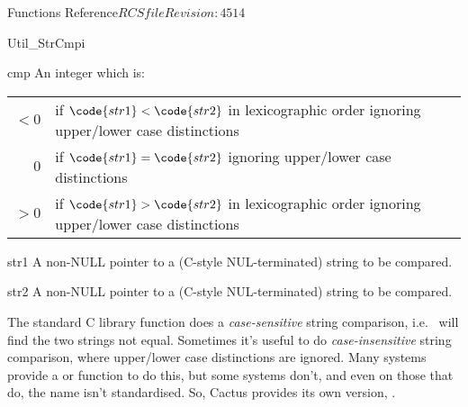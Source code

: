 \begin{cactuspart}{ Functions Reference}{$RCSfile$}{$Revision: 4514 $}
\begin{FunctionDescription}{Util\_StrCmpi}
\begin{ResultSection}
\begin{Result}{cmp}
An integer which is:\\
\begin{tabular}{@{}rl}
$<0$	& if $\code{str1} < \code{str2}$ in lexicographic order
	  ignoring upper/lower case distinctions			\\
$0$	& if $\code{str1} = \code{str2}$
	  ignoring upper/lower case distinctions			\\
$>0$	& if $\code{str1} > \code{str2}$ in lexicographic order
	  ignoring upper/lower case distinctions			%
\end{tabular}
\end{Result}
\end{ResultSection}

\begin{ParameterSection}
\begin{Parameter}{str1}
A non-NULL pointer to a (C-style NUL-terminated) string to be compared.
\end{Parameter}
\begin{Parameter}{str2}
A non-NULL pointer to a (C-style NUL-terminated) string to be compared.
\end{Parameter}
\end{ParameterSection}

\begin{Discussion}
The standard C library  function does a {\em case-sensitive\/}
string comparison, i.e.\  will find the
two strings not equal.  Sometimes it's useful to do {\em case-insensitive\/}
string comparison, where upper/lower case distinctions are ignored.
Many systems provide a  or 
function to do this, but some systems don't, and even on those that do,
the name isn't standardised.  So, Cactus provides its own version,
.


\end{Discussion}
\end{FunctionDescription}
\end{cactuspart}
